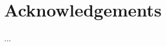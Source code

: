 \documentclass[
11pt, %
british, %
singlespacing, %
headsepline, %
]{MastersDoctoralThesis} %
\begin{document}


\chapter*{Acknowledgements}

...


\tableofcontents %

\listoffigures %

\listoftables %

\end{document}
